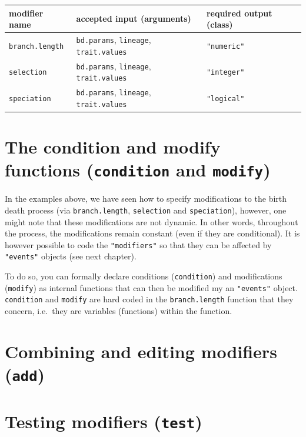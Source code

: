 \documentclass[]{book}
\begin{document}
\begin{longtable}[]{@{}lll@{}}
\toprule
modifier name & accepted input (arguments) & required output (class)\tabularnewline
\midrule
\endhead
\texttt{branch.length} & \texttt{bd.params}, \texttt{lineage}, \texttt{trait.values} & \texttt{"numeric"}\tabularnewline
\texttt{selection} & \texttt{bd.params}, \texttt{lineage}, \texttt{trait.values} & \texttt{"integer"}\tabularnewline
\texttt{speciation} & \texttt{bd.params}, \texttt{lineage}, \texttt{trait.values} & \texttt{"logical"}\tabularnewline
\bottomrule
\end{longtable}

\hypertarget{the-condition-and-modify-functions-condition-and-modify}{%
\section{\texorpdfstring{The condition and modify functions (\texttt{condition} and \texttt{modify})}{The condition and modify functions (condition and modify)}}\label{the-condition-and-modify-functions-condition-and-modify}}

In the examples above, we have seen how to specify modifications to the birth death process (via \texttt{branch.length}, \texttt{selection} and \texttt{speciation}), however, one might note that these modifications are not dynamic.
In other words, throughout the process, the modifications remain constant (even if they are conditional).
It is however possible to code the \texttt{"modifiers"} so that they can be affected by \texttt{"events"} objects (see next chapter).

To do so, you can formally declare conditions (\texttt{condition}) and modifications (\texttt{modify}) as internal functions that can then be modified my an \texttt{"events"} object.
\texttt{condition} and \texttt{modify} are hard coded in the \texttt{branch.length} function that they concern, i.e.~they are variables (functions) within the function.

\hypertarget{combining-and-editing-modifiers-add}{%
\section{\texorpdfstring{Combining and editing modifiers (\texttt{add})}{Combining and editing modifiers (add)}}\label{combining-and-editing-modifiers-add}}

\hypertarget{testing-modifiers-test}{%
\section{\texorpdfstring{Testing modifiers (\texttt{test})}{Testing modifiers (test)}}\label{testing-modifiers-test}}
\end{document}
